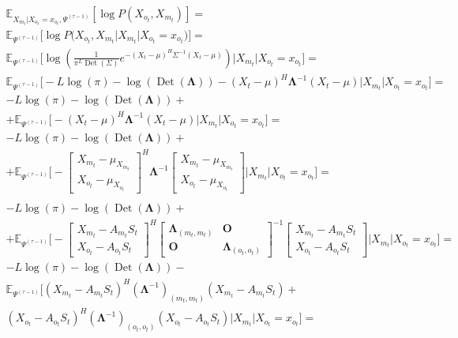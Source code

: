 \documentclass[11pt]{article}
\newcommand{\Expect}{\mathbb{E}}
\DeclareMathOperator{\Det}{Det}
\begin{document}
\begin{equation*}
\begin{gathered}
\Expect_{X_{m_t}|X_{o_t}=x_{o_t}, \Psi^{(\tau-1)}}[\log P(X_{o_t}, X_{m_t})]=\\
\Expect_{\Psi^{(\tau-1)}}\Big[\log P\Big(X_{o_t}, X_{m_t}\Big|X_{m_t}|X_{o_t}=x_{o_t}\Big)\Big]=\\
\Expect_{\Psi^{(\tau-1)}}\bigg[\log \left(\frac{1}{\pi^{L}\Det(\Sigma)}e^{-(X_t-\mu)^H\Sigma^{-1}(X_t-\mu)}\right)\Big|X_{m_t}|X_{o_t}=x_{o_t}\bigg]=\\
\Expect_{\Psi^{(\tau-1)}}\bigg[-L \log(\pi) - \log (\Det(\mathbf{\Lambda})) - (X_t - \mu)^H\mathbf{\Lambda}^{-1}(X_t - \mu)\Big|X_{m_t}|X_{o_t}=x_{o_t}\bigg]=\\
-L \log(\pi) - \log (\Det(\mathbf{\Lambda})) + \\ + \Expect_{\Psi^{(\tau-1)}}\bigg[- (X_t - \mu)^H\mathbf{\Lambda}^{-1}(X_t - \mu)\Big|X_{m_t}|X_{o_t}=x_{o_t}\bigg]=\\
-L \log(\pi) - \log (\Det(\mathbf{\Lambda}))  + \\ + \Expect_{\Psi^{(\tau-1)}}\bigg[- 
\begin{bmatrix} X_{m_t} - \mu_{X_{m_t}} \\  X_{o_t} - \mu_{X_{o_t}} \end{bmatrix}^H \mathbf{\Lambda}^{-1}
\begin{bmatrix} X_{m_t} - \mu_{X_{m_t}} \\  X_{o_t} - \mu_{X_{o_t}} \end{bmatrix}\Big|X_{m_t}|X_{o_t}=x_{o_t}\bigg] = \\
\end{gathered}
\end{equation*}
\begin{equation*}
\begin{gathered}
-L \log(\pi) - \log (\Det(\mathbf{\Lambda}))  + \\ + \Expect_{\Psi^{(\tau-1)}}\bigg[- 
\begin{bmatrix} X_{m_t} - A_{m_t}S_t \\  X_{o_t} - A_{o_t}S_t  \end{bmatrix}^H
\begin{bmatrix} \mathbf{\Lambda}_{(m_t, m_t)} & \mathbf{O} \\  \mathbf{O} & \mathbf{\Lambda}_{(o_t, o_t)} \end{bmatrix}^{-1}
\begin{bmatrix} X_{m_t} - A_{m_t}S_t \\  X_{o_t} - A_{o_t}S_t  \end{bmatrix}\Big|X_{m_t}|X_{o_t}=x_{o_t}\bigg] = \\
-L \log(\pi) - \log (\Det(\mathbf{\Lambda}))  - \\ \Expect_{\Psi^{(\tau-1)}}
\bigg[ (X_{m_t} - A_{m_t}S_t)^H (\mathbf{\Lambda}^{-1})_{(m_t, m_t)} (X_{m_t} - A_{m_t}S_t) + \\
(X_{o_t} - A_{o_t}S_t)^H (\mathbf{\Lambda}^{-1})_{(o_t, o_t)} (X_{o_t} - A_{o_t}S_t)
\Big|X_{m_t}|X_{o_t}=x_{o_t}\bigg] = \\
\end{gathered}
\end{equation*}
\end{document}
